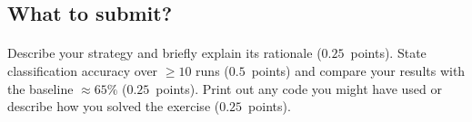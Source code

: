 \documentclass[11pt,a4paper]{article}
\newcommand{\points}[1]{({\color{magenta}$#1$~points})}
\begin{document}
\subsection*{What to submit?}

\paragraph{} Describe your strategy and briefly explain its rationale \points{0.25}. State classification accuracy over $\geq 10$ runs \points{0.5} and compare your results with the baseline $\approx 65\%$ \points{0.25}. Print out any code you might have used or describe how you solved the exercise \points{0.25}.



\end{document}
